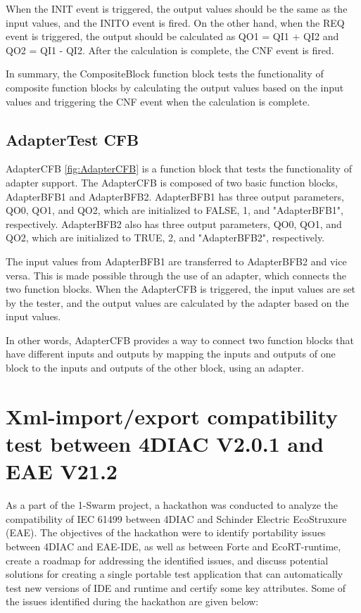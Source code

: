 \documentclass[conference]{IEEEtran}
\begin{document}
When the INIT event is triggered, the output values should be the same as the input values, and the INITO event is fired. On the other hand, when the REQ event is triggered, the output should be calculated as QO1 = QI1 + QI2 and QO2 = QI1 - QI2. After the calculation is complete, the CNF event is fired.

In summary, the CompositeBlock function block tests the functionality of composite function blocks by calculating the output values based on the input values and triggering the CNF event when the calculation is complete.

\subsection{AdapterTest CFB}


AdapterCFB \ref{fig:AdapterCFB} is a function block that tests the functionality of adapter support. The AdapterCFB is composed of two basic function blocks, AdapterBFB1 and AdapterBFB2. AdapterBFB1 has three output parameters, QO0, QO1, and QO2, which are initialized to FALSE, 1, and "AdapterBFB1", respectively. AdapterBFB2 also has three output parameters, QO0, QO1, and QO2, which are initialized to TRUE, 2, and "AdapterBFB2", respectively.

The input values from AdapterBFB1 are transferred to AdapterBFB2 and vice versa. This is made possible through the use of an adapter, which connects the two function blocks. When the AdapterCFB is triggered, the input values are set by the tester, and the output values are calculated by the adapter based on the input values.

In other words, AdapterCFB provides a way to connect two function blocks that have different inputs and outputs by mapping the inputs and outputs of one block to the inputs and outputs of the other block, using an adapter.

\section{Xml-import/export compatibility test
between 4DIAC  V2.0.1 and EAE 
V21.2}

As a part of the 1-Swarm project, a hackathon was conducted to analyze the compatibility of IEC 61499 between 4DIAC and Schinder Electric EcoStruxure (EAE). The objectives of the hackathon were to identify portability issues between 4DIAC and EAE-IDE, as well as between Forte and EcoRT-runtime, create a roadmap for addressing the identified issues, and discuss potential solutions for creating a single portable test application that can automatically test new versions of IDE and runtime and certify some key attributes. Some of the issues identified during the hackathon are given below: 
\end{document}

